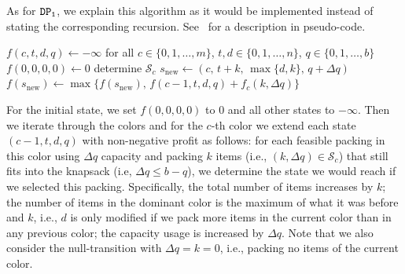 \documentclass[preprint,11pt]{elsarticle}
\newcommand{\profit}{p}
\newcommand{\weight}{w}
\newcommand{\capacity}{b}
\newcommand{\firstDP}{{\tt DP_1}}
\newcommand{\secondDP}{{\tt DP_2}}
\theoremstyle{definition}
\begin{document}
As for $\firstDP$, we explain this algorithm as it would be implemented instead of stating the corresponding recursion.
See~ for a description in pseudo-code.
\begin{algorithm}
    \caption{$\secondDP$ algorithm for the CKP }
    \label{seconddp}
    \begin{algorithmic}[1]
        \Function{$\secondDP$}{$m,n, \boldsymbol \kappa, \boldsymbol\profit , \boldsymbol\weight, \capacity$}
        \State $f(c,t,d,q) \gets -\infty$ for all $c \in \{0, 1,\dots,m\}$, $t,d \in \{0,1,\dots,n\}$, $q \in \{0,1,\dots,\capacity\} $
        \State $f(0,0,0,0) \gets 0$ 
        \State determine $\mathcal{S}_c$ 
        \For{$(k,\Delta q) \in \mathcal{S}_c$ with  $q + \Delta q \leq \capacity $}
        \State $s_\mathrm{new} \gets (c, \, t + k, \, \max\{d,k\}, \, q+ \Delta q)$
        \State $f(s_\mathrm{new}) \gets \max\{f(s_\mathrm{new}), \, f(c-1,t,d,q) + f_{c}(k, \Delta q)\}$ 
        \EndFor
        \EndFor
        \EndFor
        \EndFunction
    \end{algorithmic}
\end{algorithm}

For the initial state, we set \(f(0,0,0,0)\) to \(0\) and all other states to \(-\infty\).
Then we iterate through the colors and for the \(c\)-th color we extend each state $(c-1,t,d,q)$ with non-negative profit as follows:
for each feasible packing in this color using $\Delta q$ capacity and packing $k$ items (i.e., $(k,\Delta q) \in \mathcal{S}_c$) that still fits into the knapsack (i.e, $\Delta q \leq \capacity - q$), we determine the state we would reach if we selected this packing.
Specifically, the total number of items increases by $k$; the number of items in the dominant color is the maximum of what it was before and $k$, i.e., $d$ is only modified if we pack more items in the current color than in any previous color; the capacity usage is increased by $\Delta q$. 
Note that we also consider the null-transition with $\Delta q = k = 0$, i.e., packing no items of the current color. 


\smallskip
\end{document}
